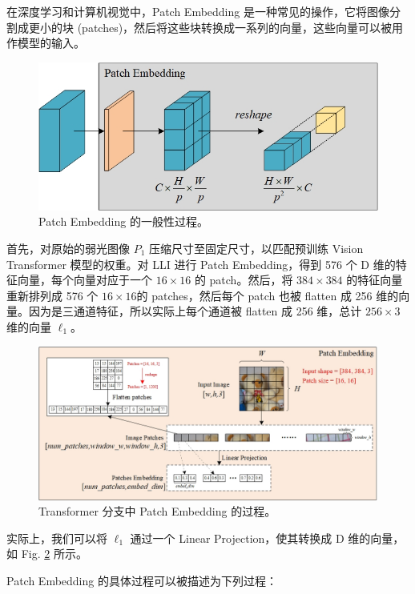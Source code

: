\documentclass[a4paper, 10pt]{article}
\begin{document}
		在深度学习和计算机视觉中，Patch Embedding 是一种常见的操作，它将图像分割成更小的块 (patches)，然后将这些块转换成一系列的向量，这些向量可以被用作模型的输入。
		
		\begin{figure}[htb]
			\centering 
			\includegraphics[width=0.5\columnwidth]{picture/LLIE/My Architecture/Patch Embedding}
			\caption{
				\label{fig: Patch Embedding} 
				Patch Embedding 的一般性过程。
			}
		\end{figure}
		
		首先，对原始的弱光图像 $P_1$ 压缩尺寸至固定尺寸，以匹配预训练 Vision Transformer 模型的权重。对 LLI 进行 Patch Embedding，得到 576 个 D 维的特征向量，每个向量对应于一个 $16 \times 16$ 的 patch。然后，将 $384 \times 384$ 的特征向量重新排列成 576 个 $16 \times 16$的 patches，然后每个 patch 也被 flatten 成 256 维的向量。因为是三通道特征，所以实际上每个通道被 flatten 成 256 维，总计 $256 \times 3$ 维的向量 $\ell_1$。
		
		\begin{figure}[htb]
			\centering 
			\includegraphics[width=0.8\columnwidth]{picture/LLIE/My Architecture/Patch Embedding(ViT)}
			\caption{
				\label{fig: Patch Embedding(ViT)} 
				Transformer 分支中 Patch Embedding 的过程。
			}
		\end{figure}
		
		实际上，我们可以将 $\ell_1$ 通过一个 Linear Projection，使其转换成 D 维的向量，如 Fig. \ref{fig: Patch Embedding(ViT)} 所示。
		
		Patch Embedding 的具体过程可以被描述为下列过程：
		
\end{document}
